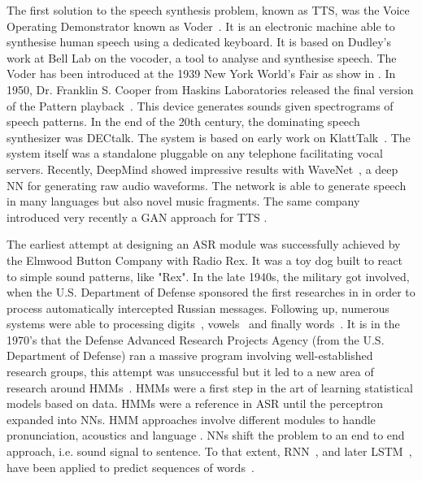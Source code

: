 The first solution to the speech synthesis problem, known as \gls{TTS}, was the Voice Operating Demonstrator known as Voder~\parencite{voder}. It is an electronic machine able to synthesise human speech using a dedicated keyboard. It is based on Dudley's work at Bell Lab on the vocoder, a tool to analyse and synthesise speech. The Voder has been introduced at the 1939 New York World's Fair as show in . In 1950, Dr. Franklin S. Cooper from Haskins Laboratories released the final version of the Pattern playback~\parencite{pattern-plaback}. This device generates sounds given spectrograms of speech patterns. In the end of the 20th century, the dominating speech synthesizer was DECtalk. The system is based on early work on KlattTalk~\parencite{klatttalk}. The system itself was a standalone pluggable on any telephone facilitating vocal servers. Recently, DeepMind showed impressive results with WaveNet~\parencite{wavenet}, a deep \gls{NN} for generating raw audio waveforms. The network is able to generate speech in many languages but also novel music fragments. The same company introduced very recently a \gls{GAN} approach for \gls{TTS} \parencite{bikowski2019high}.

The earliest attempt at designing an \gls{ASR} module was successfully achieved by the Elmwood Button Company with Radio Rex. It was a toy dog built to react to simple sound patterns, like "Rex". In the late 1940s, the military got involved, when the U.S. Department of Defense sponsored the first researches in  in order to process automatically intercepted Russian messages. Following up, numerous systems were able to processing digits~\parencite{davis1952automatic}, vowels~\parencite{forgie} and finally words~\parencite{gold}.
It is in the 1970's that the Defense Advanced Research Projects Agency (from the U.S. Department of Defense) ran a massive  program involving well-established research groups, this attempt was unsuccessful but it led to a new area of research around \glspl{HMM}~\parencite{hmm}.
\glspl{HMM} were a first step in the art of learning statistical models based on data. \glspl{HMM} were a reference in \gls{ASR} until the perceptron~\parencite{Rosenblatt58theperceptron} expanded into \glspl{NN}. \gls{HMM} approaches involve different modules to handle pronunciation, acoustics and language . \glspl{NN} shift the problem to an end to end approach, i.e. sound signal to sentence. To that extent, \gls{RNN}~\parencite{rnn}, and later \gls{LSTM}~\parencite{lstm}, have been applied to predict sequences of words~\parencite{rnn-asr}.


